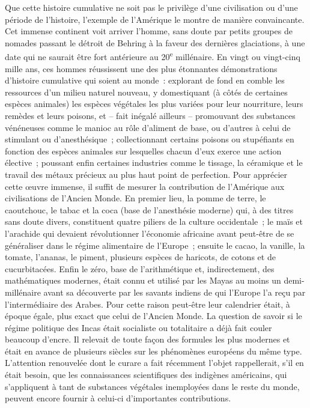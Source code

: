\documentclass[french,twoside]{book} %
\begin{document}
Que cette histoire cumulative ne soit pas le privilège d’une civilisation ou d’une période de l’histoire, l’exemple de l’Amérique le montre de manière convaincante. Cet immense continent voit arriver l’homme, sans doute par petits groupes de nomades passant le détroit de Behring à la faveur des dernières glaciations, à une date qui ne saurait être fort antérieure au 20\textsuperscript{e} millénaire. En vingt ou vingt-cinq mille ans, ces hommes réussissent une des plus étonnantes démonstrations d’histoire cumulative qui soient au monde : explorant de fond en comble les ressources d’un milieu naturel nouveau, y domestiquant (à côtés de certaines espèces animales) les espèces végétales les plus variées pour leur nourriture, leurs remèdes et leurs poisons, et – fait inégalé ailleurs – promouvant des substances vénéneuses comme le manioc au rôle d’aliment de base, ou d’autres à celui de stimulant ou d’anesthésique ; collectionnant certains poisons ou stupéfiants en fonction des espèces animales sur lesquelles chacun d’eux exerce une action élective ; poussant enfin certaines industries comme le tissage, la céramique et le travail des métaux précieux au plus haut point de perfection. Pour apprécier cette œuvre immense, il suffit de mesurer la contribution de l’Amérique aux civilisations de l’Ancien Monde. En premier lieu, la pomme de terre, le caoutchouc, le tabac et la coca (base de l’anesthésie moderne) qui, à des titres sans doute divers, constituent quatre piliers de la culture occidentale ; le maïs et l’arachide qui devaient révolutionner l’économie africaine avant peut-être de se généraliser dans le régime alimentaire de l’Europe ; ensuite le cacao, la vanille, la tomate, l’ananas, le piment, plusieurs espèces de haricots, de cotons et de cucurbitacées. Enfin le zéro, base de l’arithmétique et, indirectement, des mathématiques modernes, était connu et utilisé par les Mayas au moins un demi-millénaire avant sa découverte par les savants indiens de qui l’Europe l’a reçu par l’intermédiaire des Arabes. Pour cette raison peut-être leur calendrier était, à époque égale, plus exact que celui de l’Ancien Monde. La question de savoir si le régime politique des Incas était socialiste ou totalitaire a déjà fait couler beaucoup d’encre. Il relevait de toute façon des formules les plus modernes et était en avance de plusieurs siècles sur les phénomènes européens du même type. L’attention renouvelée dont le curare a fait récemment l’objet rappellerait, s’il en était besoin, que les connaissances scientifiques des indigènes américains, qui s’appliquent à tant de substances végétales inemployées dans le reste du monde, peuvent encore fournir à celui-ci d’importantes contributions.
\end{document}
